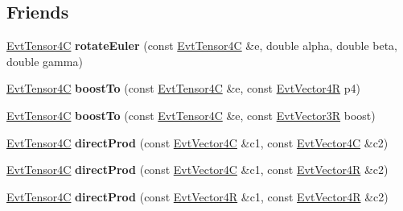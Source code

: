 \subsection*{Friends}
\begin{DoxyCompactItemize}
\item 
\hypertarget{class_evt_tensor4_c_a21a602e6203c316c5fc55d14e1d6abd9}{}\hyperlink{class_evt_tensor4_c}{Evt\+Tensor4\+C} {\bfseries rotate\+Euler} (const \hyperlink{class_evt_tensor4_c}{Evt\+Tensor4\+C} \&e, double alpha, double beta, double gamma)\label{class_evt_tensor4_c_a21a602e6203c316c5fc55d14e1d6abd9}

\item 
\hypertarget{class_evt_tensor4_c_af636b65da8431d1e1d88b9a97737b2ec}{}\hyperlink{class_evt_tensor4_c}{Evt\+Tensor4\+C} {\bfseries boost\+To} (const \hyperlink{class_evt_tensor4_c}{Evt\+Tensor4\+C} \&e, const \hyperlink{class_evt_vector4_r}{Evt\+Vector4\+R} p4)\label{class_evt_tensor4_c_af636b65da8431d1e1d88b9a97737b2ec}

\item 
\hypertarget{class_evt_tensor4_c_a30f734aa4374daf427b1723b53e7ad9c}{}\hyperlink{class_evt_tensor4_c}{Evt\+Tensor4\+C} {\bfseries boost\+To} (const \hyperlink{class_evt_tensor4_c}{Evt\+Tensor4\+C} \&e, const \hyperlink{class_evt_vector3_r}{Evt\+Vector3\+R} boost)\label{class_evt_tensor4_c_a30f734aa4374daf427b1723b53e7ad9c}

\item 
\hypertarget{class_evt_tensor4_c_aefe2bae02592663ba740fc2c142f5369}{}\hyperlink{class_evt_tensor4_c}{Evt\+Tensor4\+C} {\bfseries direct\+Prod} (const \hyperlink{class_evt_vector4_c}{Evt\+Vector4\+C} \&c1, const \hyperlink{class_evt_vector4_c}{Evt\+Vector4\+C} \&c2)\label{class_evt_tensor4_c_aefe2bae02592663ba740fc2c142f5369}

\item 
\hypertarget{class_evt_tensor4_c_ac845bcb113a96a8fb477ba110ea381a2}{}\hyperlink{class_evt_tensor4_c}{Evt\+Tensor4\+C} {\bfseries direct\+Prod} (const \hyperlink{class_evt_vector4_c}{Evt\+Vector4\+C} \&c1, const \hyperlink{class_evt_vector4_r}{Evt\+Vector4\+R} \&c2)\label{class_evt_tensor4_c_ac845bcb113a96a8fb477ba110ea381a2}

\item 
\hypertarget{class_evt_tensor4_c_a671ed9df43223cd1b9d63c43761d4a5b}{}\hyperlink{class_evt_tensor4_c}{Evt\+Tensor4\+C} {\bfseries direct\+Prod} (const \hyperlink{class_evt_vector4_r}{Evt\+Vector4\+R} \&c1, const \hyperlink{class_evt_vector4_r}{Evt\+Vector4\+R} \&c2)\label{class_evt_tensor4_c_a671ed9df43223cd1b9d63c43761d4a5b}


\end{DoxyCompactItemize}
